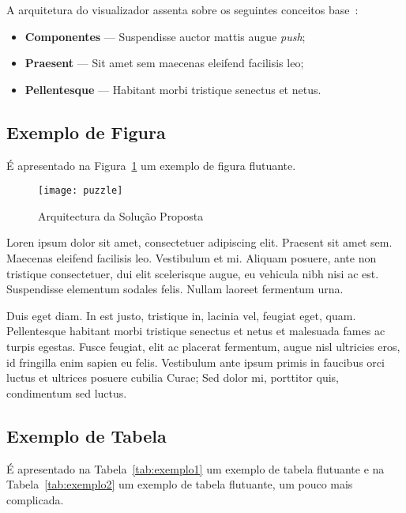 A arquitetura do visualizador assenta sobre os seguintes conceitos
base~\cite{kn:ZPMD97}: 

\begin{itemize}
\item \textbf{Componentes} --- Suspendisse auctor mattis augue \emph{push};
\item \textbf{Praesent} --- Sit amet sem maecenas eleifend facilisis leo;
\item \textbf{Pellentesque} --- Habitant morbi tristique senectus et netus.
\end{itemize}

\subsection{Exemplo de Figura}

É apresentado na Figura~\ref{fig:arch} %
um exemplo de figura flutuante.

\begin{figure}[t]
  \begin{center}
    \leavevmode
    \texttt{[image: puzzle]}
    \caption{Arquitectura da Solução Proposta}
    \label{fig:arch}
  \end{center}
\end{figure}

Loren ipsum dolor sit amet, consectetuer adipiscing elit. 
Praesent sit amet sem. Maecenas eleifend facilisis leo. Vestibulum et
mi. Aliquam posuere, ante non tristique consectetuer, dui elit
scelerisque augue, eu vehicula nibh nisi ac est. Suspendisse elementum
sodales felis. Nullam laoreet fermentum urna. 

Duis eget diam. In est justo, tristique in, lacinia vel, feugiat eget,
quam. Pellentesque habitant morbi tristique senectus et netus et
malesuada fames ac turpis egestas. Fusce feugiat, elit ac placerat
fermentum, augue nisl ultricies eros, id fringilla enim sapien eu
felis. Vestibulum ante ipsum primis in faucibus orci luctus et
ultrices posuere cubilia Curae; Sed dolor mi, porttitor quis,
condimentum sed luctus. 

\subsection{Exemplo de Tabela}

É apresentado na Tabela~\ref{tab:exemplo1} um exemplo de tabela
flutuante e na Tabela~\ref{tab:exemplo2} um exemplo de tabela
flutuante, um pouco mais complicada.

